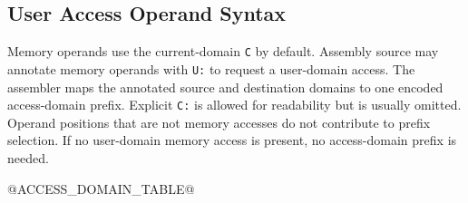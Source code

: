 \subsection{User Access Operand Syntax}
Memory operands use the current-domain \texttt{C} by default. Assembly source may annotate memory operands
with \texttt{U:} to request a user-domain access. The assembler maps the annotated source and destination
domains to one encoded access-domain prefix. Explicit \texttt{C:} is allowed for readability but is
usually omitted. Operand positions that are not memory accesses do not contribute to prefix selection. If no
user-domain memory access is present, no access-domain prefix is needed.

@ACCESS_DOMAIN_TABLE@
